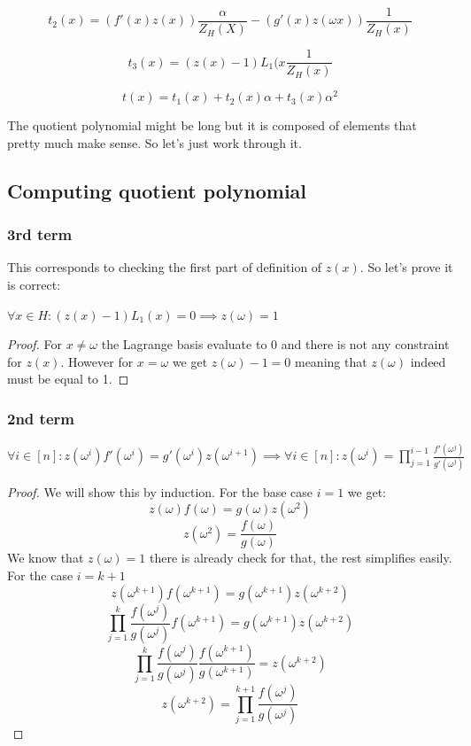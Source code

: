 \begin{equation}\label{quotient2}
    t_2(x) = (f'(x)z(x))\frac{\alpha}{Z_H(X)} - (g'(x)z(\omega x))\frac{1}{Z_H(x)}
\end{equation}

\begin{equation}\label{quotient3}
    t_3(x) = (z(x)-1)L_1(x\frac{1}{Z_H(x)}
\end{equation}

$$t(x) = t_1(x) + t_2(x) \alpha + t_3(x) \alpha^2$$

The quotient polynomial might be long but it is composed of elements that pretty much make sense. So let's just work through it.

\subsection{Computing quotient polynomial}

\subsubsection{3rd term}
This corresponds to checking the first part of definition of $z(x)$. So let's prove it is correct: 
\begin{theorem}
    $\forall x \in H: (z(x)-1)L_1(x) = 0 \implies z(\omega) = 1$
\end{theorem}

\begin{proof}
    For $x \neq \omega$ the Lagrange basis evaluate to 0 and there is not any constraint for $z(x)$. However for $x = \omega$ we get $z(\omega) - 1 = 0$ meaning that $z(\omega)$ indeed must be equal to 1.
\end{proof}

\subsubsection{2nd term}
\begin{theorem}
    $\forall i \in [n]: z(\omega^i)f'(\omega^i) = g'(\omega^i)z(\omega^{i+1}) \implies \forall i \in [n]: z(\omega^i) = \prod_{j=1}^{i-1} \frac{f'(\omega^j)}{g'(\omega^j)}$
\end{theorem}

\begin{proof}
    We will show this by induction. For the base case $i=1$ we get:
    $$z(\omega)f(\omega) = g(\omega)z(\omega^2)$$
    $$z(\omega^2) = \frac{f(\omega)}{g(\omega)}$$
    We know that $z(\omega) = 1$ there is already check for that, the rest simplifies easily. For the case $i =k+1$
    $$z(\omega^{k+1})f(\omega^{k+1}) = g(\omega^{k+1})z(\omega^{k+2})$$
    $$\prod_{j=1}^k \frac{f(\omega^j)}{g(\omega^j)} f(\omega^{k+1}) = g(\omega^{k+1})z(\omega^{k+2})$$
    $$\prod_{j=1}^k \frac{f(\omega^j)}{g(\omega^j)} \frac{f(\omega^{k+1})}{g(\omega^{k+1})} = z(\omega^{k+2})$$
    $$z(\omega^{k+2}) = \prod_{j=1}^{k+1} \frac{f(\omega^j)}{g(\omega^j)}$$    
\end{proof}


